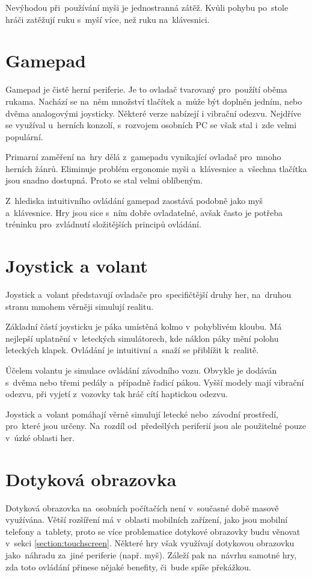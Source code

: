 \documentclass[thesis=B,czech,hidelinks]{FITthesis}[2012/06/26] %
\begin{document}
Nevýhodou při~používání myši je jednostranná zátěž. Kvůli pohybu po~stole hráči zatěžují ruku s~myší více, než ruku na~klávesnici.

\section{Gamepad}

Gamepad je čistě herní periferie. Je to ovladač tvarovaný pro~použítí oběma rukama. Nachází se na~něm množství tlačítek a~může být doplněn jedním, nebo dvěma analogovými joysticky. Některé verze nabízejí i vibrační odezvu. Nejdříve se využíval u~herních konzolí, s~rozvojem osobních PC se však stal i~zde velmi populární.

Primarní zaměření na~hry dělá z~gamepadu vynikající ovladač pro~mnoho herních žánrů. Eliminuje problém ergonomie myši a~klávesnice a~všechna tlačítka jsou snadno dostupná. Proto se stal velmi oblíbeným.

Z~hlediska intuitivního ovládání gamepad zaostává podobně jako myš a~klávesnice. Hry jsou sice s~ním dobře ovladatelné, avšak často je potřeba tréninku pro~zvládnutí složitějších principů ovládání.

\section{Joystick a volant}

Joystick a~volant představují ovladače pro~specifičtější druhy her, na~druhou stranu mmohem věrněji simulují realitu.

Základní částí joysticku je páka umístěná kolmo v~pohyblivém kloubu. Má nejlepší uplatnění v~leteckých simulátorech, kde náklon páky mění polohu leteckých klapek. Ovládání je intuitivní a~snaží se přiblížit k~realitě.

Účelem volantu je simulace ovládání závodního vozu. Obvykle je dodáván s~dvěma nebo třemi pedály a~případně řadicí pákou. Vyšší modely mají vibrační odezvu, při vyjetí z~vozovky tak hráč cítí haptickou odezvu.

Joystick a~volant pomáhají věrně simulují letecké nebo~závodní prostředí, pro~které jsou určeny. Na~rozdíl od~předešlých periferií jsou ale použitelné pouze v~úzké oblasti her.

\section{Dotyková obrazovka}

Dotyková obrazovka na~osobních počítačích není v~současné době masově využívána. Větší rozšíření má v~oblasti mobilních zařízení, jako jsou mobilní telefony a~tablety, proto se více problematice dotykové obrazovky budu věnovat v~sekci \ref{section:touchscreen}. Některé hry však využívají dotykovou obrazovku jako~náhradu za~jiné periferie (např. myš). Záleží pak na~návrhu samotné hry, zda toto ovládání přinese nějaké benefity, či~bude spíše překážkou.
\end{document}
